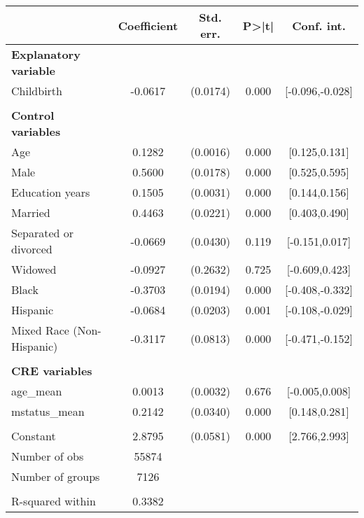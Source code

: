 {
\def\sym#1{\ifmmode^{#1}\else\(^{#1}\)\fi}
\begin{tabular}{l*{1}{cccc}}
\toprule
                    & Coefficient&   Std. err.&       P>|t|&  Conf. int.\\
\midrule
\textbf{Explanatory variable}&            &            &            &            \\
Childbirth          &     -0.0617&    (0.0174)&       0.000&[-0.096,-0.028]\\
\\ \textbf{Control variables}&            &            &            &            \\
Age                 &      0.1282&    (0.0016)&       0.000&[0.125,0.131]\\
Male                &      0.5600&    (0.0178)&       0.000&[0.525,0.595]\\
Education years     &      0.1505&    (0.0031)&       0.000&[0.144,0.156]\\
Married             &      0.4463&    (0.0221)&       0.000&[0.403,0.490]\\
Separated or divorced&     -0.0669&    (0.0430)&       0.119&[-0.151,0.017]\\
Widowed             &     -0.0927&    (0.2632)&       0.725&[-0.609,0.423]\\
Black               &     -0.3703&    (0.0194)&       0.000&[-0.408,-0.332]\\
Hispanic            &     -0.0684&    (0.0203)&       0.001&[-0.108,-0.029]\\
Mixed Race (Non-Hispanic)&     -0.3117&    (0.0813)&       0.000&[-0.471,-0.152]\\
\\ \textbf{CRE variables}&            &            &            &            \\
age\_mean            &      0.0013&    (0.0032)&       0.676&[-0.005,0.008]\\
mstatus\_mean        &      0.2142&    (0.0340)&       0.000&[0.148,0.281]\\
                    &            &            &            &            \\
Constant            &      2.8795&    (0.0581)&       0.000&[2.766,2.993]\\
\midrule
Number of obs       &       55874&            &            &            \\
Number of groups    &        7126&            &            &            \\
\\ R-squared within &      0.3382&            &            &            \\

\end{tabular}}
